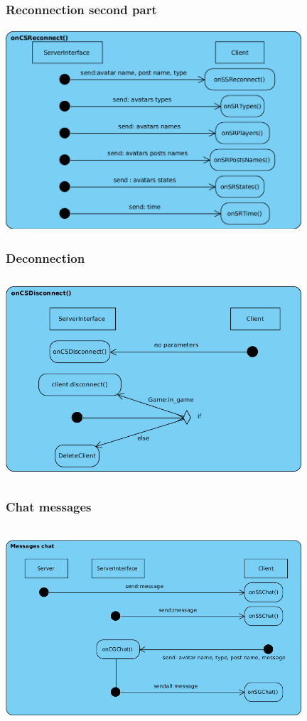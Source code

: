 \documentclass[9pt]{beamer}
\begin{document}
\begin{frame}
	\frametitle{Reconnection second part}
 	\centerline{ \includegraphics[width=11cm, height=7.5cm]{images/oncsreconnect.png}}
	\transdissolve
\end{frame}

\begin{frame}
	\frametitle{Deconnection}
 	\centerline{ \includegraphics[width=11cm, height=7.5cm]{images/oncsdisconnect.png}}
	\transdissolve
\end{frame}

\begin{frame}
	\frametitle{Chat messages}
 	\centerline{ \includegraphics[width=11cm, height=7.5cm]{images/messageschat.png}}
	\transdissolve
\end{frame}
\end{document}
